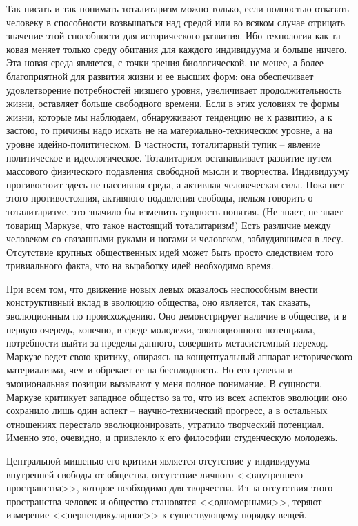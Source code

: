 \documentclass{book}
\begin{document}
Так писать и так понимать тоталитаризм можно только, ес­ли полностью отказать человеку в способности возвышаться над средой или во всяком случае отрицать значение этой спо­собности для исторического развития. Ибо технология как та­ковая меняет только среду обитания  для каждого индивиду­ума и больше ничего. Эта новая среда является, с точки зрения биологической, не менее, а более благоприятной для развития жизни и ее высших форм: она обеспечивает удовлетворение потребностей низшего уровня, увеличивает продолжительность жизни, оставляет больше свободного времени. Если в этих ус­ловиях те формы жизни, которые мы наблюдаем, обнаружи­вают тенденцию не к развитию, а к застою, то причины надо ис­кать не на материально-техническом уровне, а на уровне идей­но-политическом. В частности, тоталитарный тупик -- явление политическое и идеологическое. Тоталитаризм останавливает развитие путем массового физического подавления свободной мысли и творчества. Индивидууму противостоит здесь не пассив­ная среда, а активная 
человеческая сила. Пока нет этого проти­востояния, активного подавления свободы, нельзя говорить о тоталитаризме, это значило бы изменить сущность понятия. (Не знает, не знает товарищ Маркузе, что такое настоящий то­талитаризм!) Есть различие между человеком со связанными руками и ногами и человеком, заблудившимся в лесу. Отсутст­вие крупных общественных идей может быть просто следстви­ем того тривиального факта, что на выработку идей необхо­димо время. 

При всем том, что движение новых левых оказалось неспо­собным внести конструктивный вклад в эволюцию общества, оно является, так сказать, эволюционным по происхождению. Оно демонстрирует наличие в обществе, и в первую очередь, конечно, в среде молодежи, эволюционного потенциала, потребности выйти за пределы данного, совершить метасистемный переход. Маркузе ведет свою критику, опираясь на кон­цептуальный аппарат исторического материализма, чем и обре­кает ее на бесплодность. Но его целевая и эмоциональная пози­ции вызывают у меня полное понимание. В сущности, Маркузе критикует западное общество за то, что из всех аспектов эво­люции оно сохранило лишь один аспект -- научно-технический прогресс, а в остальных отношениях перестало эволюциони­ровать, утратило творческий потенциал. Именно это, очевид­но, и привлекло к его философии студенческую молодежь.

Центральной мишенью его критики является отсутствие у индивидуума внутренней свободы от общества, отсутствие лич­ного <<внутреннего пространства>>, которое необходимо для творчества. Из-за отсутствия этого пространства человек и об­щество становятся <<одномерными>>, теряют измерение <<пер­пендикулярное>> к существующему порядку вещей.
\end{document}
